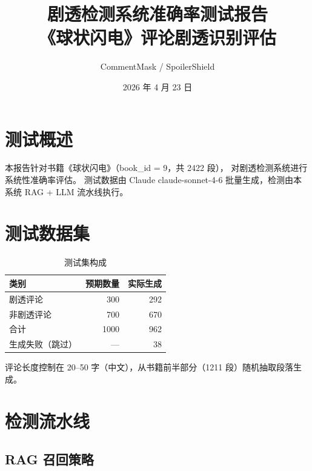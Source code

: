 \documentclass[12pt, a4paper]{article}
\title{\textbf{剧透检测系统准确率测试报告}\\
\large 《球状闪电》评论剧透识别评估}
\author{CommentMask / SpoilerShield}
\date{2026 年 4 月 23 日}
\begin{document}
\maketitle
\tableofcontents
\newpage

\section{测试概述}

本报告针对书籍《球状闪电》（book\_id = 9，共 2422 段），
对剧透检测系统进行系统性准确率评估。
测试数据由 Claude claude-sonnet-4-6 批量生成，检测由本系统 RAG + LLM 流水线执行。

\section{测试数据集}

\begin{table}[h]
\centering
\begin{tabular}{lrr}
\toprule
\textbf{类别} & \textbf{预期数量} & \textbf{实际生成} \\
\midrule
剧透评论       & 300  & 292  \\
非剧透评论     & 700  & 670  \\
\midrule
合计           & 1000 & 962  \\
生成失败（跳过）& —   & 38   \\
\bottomrule
\end{tabular}
\caption{测试集构成}
\end{table}

评论长度控制在 20--50 字（中文），从书籍前半部分（1211 段）随机抽取段落生成。

\section{检测流水线}

\subsection{RAG 召回策略}
\end{document}
